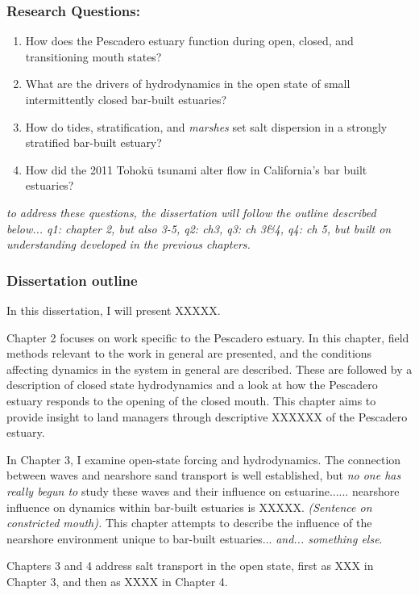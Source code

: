 \subsubsection{Research Questions:}
\begin{enumerate}
	\item{How does the Pescadero estuary function during open, closed, and transitioning mouth states?}
	\item{What are the drivers of hydrodynamics in the open state of small intermittently closed bar-built estuaries?}
	\item{How do tides, stratification, and \emph{marshes} set salt dispersion in a strongly stratified bar-built estuary?}
	\item{How did the 2011 Tohok$\overline{\mathrm{u}}$ tsunami alter flow in California's bar built estuaries?}
\end{enumerate}

\emph{to address these questions, the dissertation will follow the outline described below... q1: chapter 2, but also 3-5, q2: ch3, q3: ch 3\&4, q4: ch 5, but built on understanding developed in the previous chapters.}


\subsubsection{Dissertation outline}

In this dissertation, I will present XXXXX.

Chapter 2 focuses on work specific to the Pescadero estuary. In this chapter, field methods relevant to the work in general are presented, and the conditions affecting dynamics in the system in general are described. These are followed by a description of closed state hydrodynamics and a look at how the Pescadero estuary responds to the opening of the closed mouth. This chapter aims to provide insight to land managers through descriptive XXXXXX of the Pescadero estuary.

In Chapter 3, I examine open-state forcing and hydrodynamics. The connection between waves and nearshore sand transport is well established, but \emph{no one has really begun to } study these waves and their influence on estuarine...... nearshore influence on dynamics within bar-built estuaries is XXXXX. \emph{(Sentence on constricted mouth).} This chapter attempts to describe the influence of the nearshore environment unique to bar-built estuaries... \emph{and... something else}. 

Chapters 3 and 4 address salt transport in the open state, first as XXX in Chapter 3, and then as XXXX in Chapter 4. 

